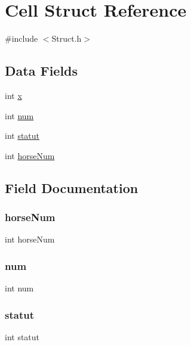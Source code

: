 \hypertarget{struct_cell}{}\section{Cell Struct Reference}
\label{struct_cell}


{\ttfamily \#include $<$Struct.\+h$>$}

\subsection*{Data Fields}
\begin{DoxyCompactItemize}
\item 
int \hyperlink{struct_cell_a6150e0515f7202e2fb518f7206ed97dc}{x}
\item 
int \hyperlink{struct_cell_a86cf672daa4e0ad11ad10efc894d19c8}{num}
\item 
int \hyperlink{struct_cell_ae6fda912a1fbaaf454b35f51919e824a}{statut}
\item 
int \hyperlink{struct_cell_aaac914e80f76d4023aa938b9a0e96c32}{horse\+Num}
\end{DoxyCompactItemize}


\subsection{Field Documentation}
\mbox{\label{struct_cell_aaac914e80f76d4023aa938b9a0e96c32}} 
\subsubsection{\texorpdfstring{horse\+Num}{horseNum}}
{\footnotesize\ttfamily int horse\+Num}

\mbox{\label{struct_cell_a86cf672daa4e0ad11ad10efc894d19c8}} 
\subsubsection{\texorpdfstring{num}{num}}
{\footnotesize\ttfamily int num}

\mbox{\label{struct_cell_ae6fda912a1fbaaf454b35f51919e824a}} 
\subsubsection{\texorpdfstring{statut}{statut}}
{\footnotesize\ttfamily int statut}

